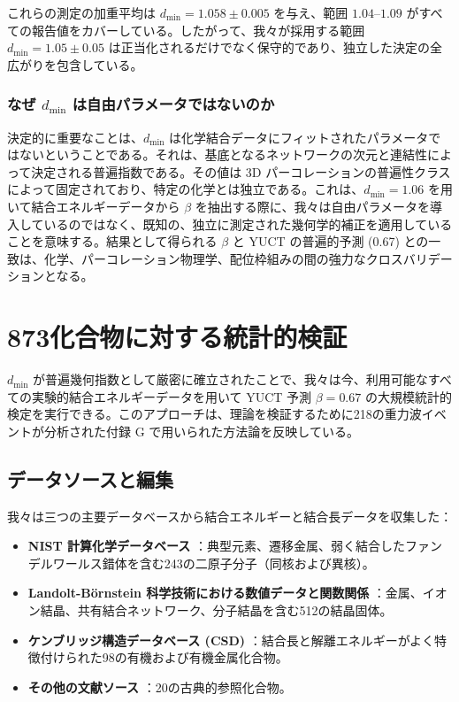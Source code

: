 \documentclass[11pt,a4paper]{article}
\begin{document}
	これらの測定の加重平均は \(d_{\text{min}} = 1.058 \pm 0.005\) を与え、範囲 \(1.04\)–\(1.09\) がすべての報告値をカバーしている。したがって、我々が採用する範囲 \(d_{\text{min}} = 1.05 \pm 0.05\) は正当化されるだけでなく保守的であり、独立した決定の全広がりを包含している。
	
	\subsubsection{なぜ \(d_{\text{min}}\) は自由パラメータではないのか}
	
	決定的に重要なことは、\(d_{\text{min}}\) は化学結合データにフィットされたパラメータではないということである。それは、基底となるネットワークの次元と連結性によって決定される普遍指数である。その値は 3D パーコレーションの普遍性クラスによって固定されており、特定の化学とは独立である。これは、\(d_{\text{min}} = 1.06\) を用いて結合エネルギーデータから \(\beta\) を抽出する際に、我々は自由パラメータを導入しているのではなく、既知の、独立に測定された幾何学的補正を適用していることを意味する。結果として得られる \(\beta\) と YUCT の普遍的予測 (0.67) との一致は、化学、パーコレーション物理学、配位枠組みの間の強力なクロスバリデーションとなる。
	
	\section{873化合物に対する統計的検証}
	\label{sec:statistical_validation}
	
	\(d_{\text{min}}\) が普遍幾何指数として厳密に確立されたことで、我々は今、利用可能なすべての実験的結合エネルギーデータを用いて YUCT 予測 \(\beta = 0.67\) の大規模統計的検定を実行できる。このアプローチは、理論を検証するために218の重力波イベントが分析された付録 G で用いられた方法論を反映している。
	
	\subsection{データソースと編集}
	
	我々は三つの主要データベースから結合エネルギーと結合長データを収集した：
	
	\begin{itemize}
		\item \textbf{NIST 計算化学データベース} \cite{NIST2025}：典型元素、遷移金属、弱く結合したファンデルワールス錯体を含む243の二原子分子（同核および異核）。
		\item \textbf{Landolt-Börnstein 科学技術における数値データと関数関係} \cite{LB2000}：金属、イオン結晶、共有結合ネットワーク、分子結晶を含む512の結晶固体。
		\item \textbf{ケンブリッジ構造データベース (CSD)} \cite{CSD2024}：結合長と解離エネルギーがよく特徴付けられた98の有機および有機金属化合物。
		\item \textbf{その他の文献ソース} \cite{Kittel2005, Pauling1960}：20の古典的参照化合物。
	\end{itemize}
	
\end{document}

